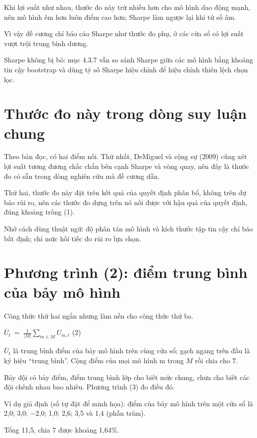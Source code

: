 Khi lợi suất như nhau, thước đo này trừ nhiều hơn cho mô hình dao động mạnh, nên mô hình êm hơn luôn điểm cao hơn; Sharpe làm ngược lại khi tử số âm.

Vì vậy đề cương chỉ báo cáo Sharpe như thước đo phụ, ở các cửa sổ có lợi suất vượt trội trung bình dương.

Sharpe không bị bỏ: mục 4.3.7 vẫn so sánh Sharpe giữa các mô hình bằng khoảng tin cậy bootstrap và dùng tỷ số Sharpe hiệu chỉnh để hiệu chỉnh thiên lệch chọn lọc.

\section{Thước đo này trong dòng suy luận chung}

Theo bản đọc, có hai điểm nối. Thứ nhất, DeMiguel và cộng sự (2009) cũng xét lợi suất tương đương chắc chắn bên cạnh Sharpe và vòng quay, nên đây là thước đo có sẵn trong dòng nghiên cứu mà đề cương dẫn.

Thứ hai, thước đo này đặt trên kết quả của quyết định phân bổ, không trên dự báo rủi ro, nên các thước đo dựng trên nó nối được với hậu quả của quyết định, đúng khoảng trống (1).

Nhớ cách dùng thuật ngữ: độ phân tán mô hình và kích thước tập tin cậy chỉ báo bất định; chỉ mức hối tiếc đo rủi ro lựa chọn.

\section{Phương trình (2): điểm trung bình của bảy mô hình}

Công thức thứ hai ngắn nhưng làm nền cho công thức thứ ba.

\({\overline{U}}_{t}\  = \ \frac{1}{|M|}\sum_{m \in M}^{}U_{m,t}\) (2)

\({\overline{U}}_{t}\) là trung bình điểm của bảy mô hình trên cùng cửa sổ; gạch ngang trên đầu là ký hiệu “trung bình”. Cộng điểm của mọi mô hình m trong \(M\) rồi chia cho 7.

Bảy đội có bảy điểm, điểm trung bình lớp cho biết mức chung, chưa cho biết các đội chênh nhau bao nhiêu. Phương trình (3) đo điều đó.

\begin{tcolorbox}[breakable]
Ví dụ giả định (số tự đặt để minh họa): điểm của bảy mô hình trên một cửa sổ là 2,0; 3,0; −2,0; 1,0; 2,6; 3,5 và 1,4 (phần trăm).

Tổng 11,5, chia 7 được khoảng 1,64\%.
\end{tcolorbox}


